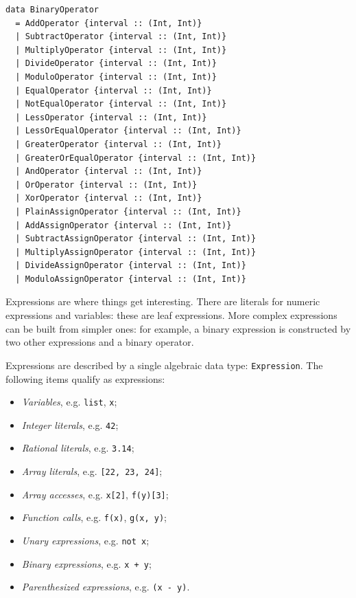 \documentclass[11pt, american, draft]{PhdThesis}
\begin{document}
\begin{verbatim}
data BinaryOperator
  = AddOperator {interval :: (Int, Int)}
  | SubtractOperator {interval :: (Int, Int)}
  | MultiplyOperator {interval :: (Int, Int)}
  | DivideOperator {interval :: (Int, Int)}
  | ModuloOperator {interval :: (Int, Int)}
  | EqualOperator {interval :: (Int, Int)}
  | NotEqualOperator {interval :: (Int, Int)}
  | LessOperator {interval :: (Int, Int)}
  | LessOrEqualOperator {interval :: (Int, Int)}
  | GreaterOperator {interval :: (Int, Int)}
  | GreaterOrEqualOperator {interval :: (Int, Int)}
  | AndOperator {interval :: (Int, Int)}
  | OrOperator {interval :: (Int, Int)}
  | XorOperator {interval :: (Int, Int)}
  | PlainAssignOperator {interval :: (Int, Int)}
  | AddAssignOperator {interval :: (Int, Int)}
  | SubtractAssignOperator {interval :: (Int, Int)}
  | MultiplyAssignOperator {interval :: (Int, Int)}
  | DivideAssignOperator {interval :: (Int, Int)}
  | ModuloAssignOperator {interval :: (Int, Int)}
\end{verbatim}

  Expressions are where things get interesting. There are literals for numeric expressions and
  variables: these are leaf expressions. More complex expressions can be built from simpler ones:
  for example, a binary expression is constructed by two other expressions and a binary operator.

  Expressions are described by a single algebraic data type: \verb$Expression$. The following items
  qualify as expressions:

  \begin{itemize}[noitemsep,topsep=0pt]
    \item \emph{Variables}, e.g. \verb$list$, \verb$x$;
    \item \emph{Integer literals}, e.g. \verb$42$;
    \item \emph{Rational literals}, e.g. \verb$3.14$;
    \item \emph{Array literals}, e.g. \verb$[22, 23, 24]$;
    \item \emph{Array accesses}, e.g. \verb$x[2]$, \verb$f(y)[3]$;
    \item \emph{Function calls}, e.g. \verb$f(x)$, \verb$g(x, y)$;
    \item \emph{Unary expressions}, e.g. \verb$not x$;
    \item \emph{Binary expressions}, e.g. \verb$x + y$;
    \item \emph{Parenthesized expressions}, e.g. \verb$(x - y)$.
  \end{itemize}
\end{document}
